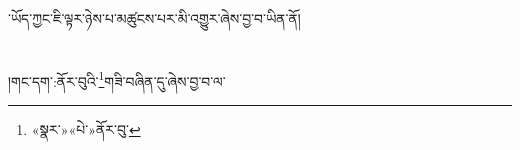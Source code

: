་ཡོད་ཀྱང་ཇི་ལྟར་ཉེས་པ་མཚུངས་པར་མི་འགྱུར་ཞེས་བྱ་བ་ཡིན་ནོ།\chapter{ }།གང་དག་:ནོར་བུའི་\footnote{«སྣར་»«པེ་»ནོར་བུ་}གཟི་བཞིན་དུ་ཞེས་བྱ་བ་ལ་